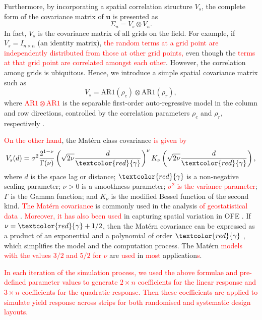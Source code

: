 \documentclass[a4paper]{article} 	%
\newcommand{\Matern}{Mat\'ern }
\newcommand{\AR}{\mathrm{AR1}}
\newcommand{\revision}[1]{\textcolor{red}{#1}}
\newcommand{\zc}[1]{\textcolor{red}{#1}}
\begin{document}
Furthermore, by incorporating a spatial correlation structure $V_s$, the complete form of the covariance matrix of $\bm{u}$ is presented as 
\begin{equation}\label{eq:varu}
	\Sigma_u = V_s \otimes V_u. 
\end{equation}
In fact, $V_s$ is the covariance matrix of all grids on the field. For example, if $V_s=I_{n\times n}$ (an identity matrix), \revision{the random terms at a grid point are independently distributed from those at other grid points,} even though the \revision{terms at that grid point are correlated amongst each other}. However, the correlation among grids is ubiquitous. Hence, we introduce a simple spatial covariance matrix such as 
\begin{equation}\label{eq:ar1cov}
	V_s = \AR(\rho_c)\otimes \AR(\rho_r),
\end{equation}
where \revision{$\AR \otimes \AR$} is the separable first-order auto-regressive model in the column and row directions, controlled by the correlation parameters $\rho_c$ and $\rho_r$, respectively \parencite{Butler2017ASRemlR}. 

\revision{On the other hand}, the \Matern class covariance \revision{is given by}
\begin{equation}\label{eq:matcov}
V_s(d) = \sigma^2 \frac{2^{1-\nu}}{\Gamma(\nu)} \left( \sqrt{2\nu} \frac{d}{\zc{\gamma}}\right)^\nu K_\nu\left( \sqrt{2\nu} \frac{d}{\zc{\gamma}}\right),
\end{equation}
 where $d$ is the space lag or distance; $\zc{\gamma}$ is a non-negative scaling parameter; $\nu> 0$ is a smoothness parameter; \revision{$\sigma^2$ is the variance parameter}; $\Gamma$ is the Gamma function; and $K_\nu$ is the modified Bessel function of the second kind. \revision{The \Matern covariance} is commonly used in the analysis \revision{of geostatistical data} \parencite{Cressie1999Classes}. \revision{Moreover, it has also been used} in capturing spatial variation in OFE \parencite{Selle2019Flexible}. If $\nu = \zc{\gamma} + 1/2$, then the \Matern covariance can be expressed as a product of an exponential and a polynomial of order $\zc{\gamma}$ \parencite{Pandit2019Comparative, Abramowitz1974Handbook}, which simplifies the model and the computation process. The \Matern \revision{models} \revision{with the values $3/2$ and $5/2$ for $\nu$} are \revision{used} in \revision{most} application\revision{s}. 


\zc{In each iteration of the simulation process, we used the above formulae and pre-defined parameter values to generate $2\times n$ coefficients for the linear response and $3\times n$ coefficients for the quadratic response. Then these coefficients are applied to simulate yield response across strips for both  randomised and systematic design layouts.}
\end{document}
